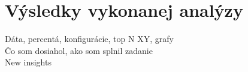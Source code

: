 \chapter{Výsledky vykonanej analýzy}
\label{analysis-and-its-results}

Dáta, percentá, konfigurácie, top N XY, grafy
\\
Čo som dosiahol, ako som splnil zadanie
\\
New insights
